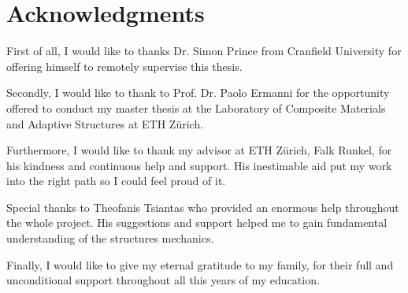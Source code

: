 \section*{Acknowledgments}
First of all, I would like to thanks Dr. Simon Prince from Cranfield University for offering himself to remotely supervise this thesis.

\noindent
Secondly, I would like to thank to Prof. Dr. Paolo Ermanni for the opportunity offered to conduct my master thesis at the Laboratory of Composite Materials and Adaptive Structures at ETH Z\"urich.

\noindent
Furthermore, I would like to thank my advisor at ETH Z\"urich, Falk Runkel, for his kindness and continuous help and support. His inestimable aid put my work into the right path so I could feel proud of it.

\noindent
Special thanks to Theofanis Tsiantas who provided an enormous help throughout the whole project. His suggestions and support helped me to gain fundamental understanding of the structures mechanics. 

\noindent
Finally, I would like to give my eternal gratitude to my family, for their full and unconditional support throughout all this years of my education.